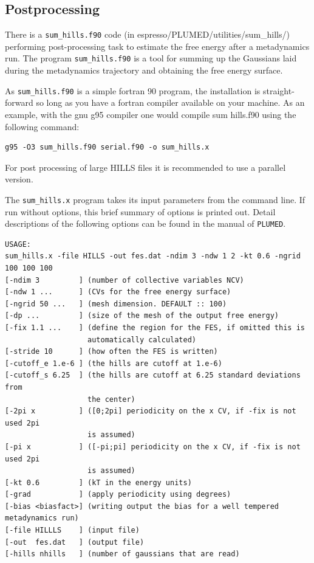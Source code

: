 \documentclass[12pt,a4paper]{article}
\begin{document}
\subsection{Postprocessing}

There is a \texttt{sum\_hills.f90} code (in espresso/PLUMED/utilities/sum\_hills/) performing post-processing task to estimate the free energy after a metadynamics run. The program \texttt{sum\_hills.f90} is a tool for summing up the Gaussians laid during the metadynamics trajectory and obtaining the free energy surface.

As \texttt{sum\_hills.f90} is a simple fortran 90 program, the installation is straight- forward so long as you have a fortran compiler available on your machine. As an example, with the gnu g95 compiler one would compile sum hills.f90 using the following command:

\begin{verbatim}
g95 -O3 sum_hills.f90 serial.f90 -o sum_hills.x
\end{verbatim}

For post processing of large HILLS files it is recommended to use a parallel version.

The \texttt{sum\_hills.x} program takes its input parameters from the command line. If run without options, this brief summary of options is printed out. Detail descriptions of the following options can be found in the manual\cite{PLUMED:manual} of \texttt{PLUMED}.

\begin{verbatim}
USAGE:
sum_hills.x -file HILLS -out fes.dat -ndim 3 -ndw 1 2 -kt 0.6 -ngrid 100 100 100
[-ndim 3         ] (number of collective variables NCV)
[-ndw 1 ...      ] (CVs for the free energy surface)
[-ngrid 50 ...   ] (mesh dimension. DEFAULT :: 100)
[-dp ...         ] (size of the mesh of the output free energy)
[-fix 1.1 ...    ] (define the region for the FES, if omitted this is 
                   automatically calculated)
[-stride 10      ] (how often the FES is written)
[-cutoff_e 1.e-6 ] (the hills are cutoff at 1.e-6)
[-cutoff_s 6.25  ] (the hills are cutoff at 6.25 standard deviations from
                   the center)
[-2pi x          ] ([0;2pi] periodicity on the x CV, if -fix is not used 2pi
                   is assumed)
[-pi x           ] ([-pi;pi] periodicity on the x CV, if -fix is not used 2pi
                   is assumed)
[-kt 0.6         ] (kT in the energy units)
[-grad           ] (apply periodicity using degrees)
[-bias <biasfact>] (writing output the bias for a well tempered metadynamics run)
[-file HILLLS    ] (input file)
[-out  fes.dat   ] (output file)
[-hills nhills   ] (number of gaussians that are read)
\end{verbatim}
\end{document}
